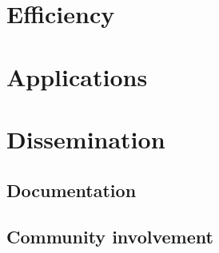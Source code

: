 \section{Efficiency}

\section{Applications}


\section{Dissemination}
\subsection{Documentation}
\subsection{Community involvement}
